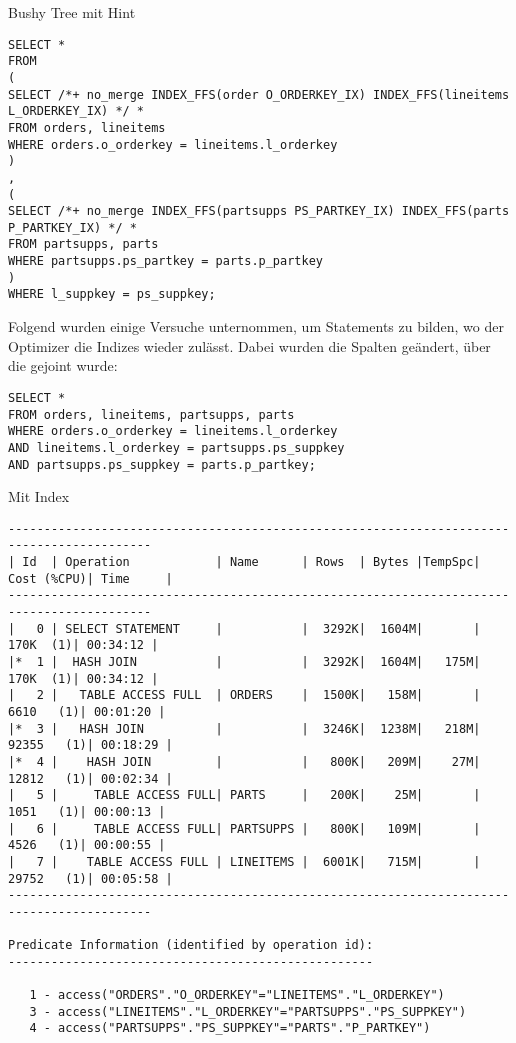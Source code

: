 \documentclass[10pt]{article}
\begin{document}
Bushy Tree mit Hint
\begin{lstlisting}[style=sql]
SELECT *
FROM 
(
SELECT /*+ no_merge INDEX_FFS(order O_ORDERKEY_IX) INDEX_FFS(lineitems L_ORDERKEY_IX) */ *
FROM orders, lineitems
WHERE orders.o_orderkey = lineitems.l_orderkey
)
,
(
SELECT /*+ no_merge INDEX_FFS(partsupps PS_PARTKEY_IX) INDEX_FFS(parts P_PARTKEY_IX) */ *
FROM partsupps, parts
WHERE partsupps.ps_partkey = parts.p_partkey
)
WHERE l_suppkey = ps_suppkey;
\end{lstlisting}

Folgend wurden einige Versuche unternommen, um Statements zu bilden, wo der Optimizer die Indizes wieder zulässt. Dabei wurden die Spalten geändert, über die gejoint wurde:
\begin{lstlisting}[style=sql]
SELECT *
FROM orders, lineitems, partsupps, parts
WHERE orders.o_orderkey = lineitems.l_orderkey
AND lineitems.l_orderkey = partsupps.ps_suppkey
AND partsupps.ps_suppkey = parts.p_partkey;
\end{lstlisting}
Mit Index
\begin{lstlisting}[style=queryexecutionplan]
------------------------------------------------------------------------------------------
| Id  | Operation            | Name      | Rows  | Bytes |TempSpc| Cost (%CPU)| Time     |
------------------------------------------------------------------------------------------
|   0 | SELECT STATEMENT     |           |  3292K|  1604M|       |   170K  (1)| 00:34:12 |
|*  1 |  HASH JOIN           |           |  3292K|  1604M|   175M|   170K  (1)| 00:34:12 |
|   2 |   TABLE ACCESS FULL  | ORDERS    |  1500K|   158M|       |  6610   (1)| 00:01:20 |
|*  3 |   HASH JOIN          |           |  3246K|  1238M|   218M| 92355   (1)| 00:18:29 |
|*  4 |    HASH JOIN         |           |   800K|   209M|    27M| 12812   (1)| 00:02:34 |
|   5 |     TABLE ACCESS FULL| PARTS     |   200K|    25M|       |  1051   (1)| 00:00:13 |
|   6 |     TABLE ACCESS FULL| PARTSUPPS |   800K|   109M|       |  4526   (1)| 00:00:55 |
|   7 |    TABLE ACCESS FULL | LINEITEMS |  6001K|   715M|       | 29752   (1)| 00:05:58 |
------------------------------------------------------------------------------------------
 
Predicate Information (identified by operation id):
---------------------------------------------------
 
   1 - access("ORDERS"."O_ORDERKEY"="LINEITEMS"."L_ORDERKEY")
   3 - access("LINEITEMS"."L_ORDERKEY"="PARTSUPPS"."PS_SUPPKEY")
   4 - access("PARTSUPPS"."PS_SUPPKEY"="PARTS"."P_PARTKEY")
\end{lstlisting}
\end{document}
